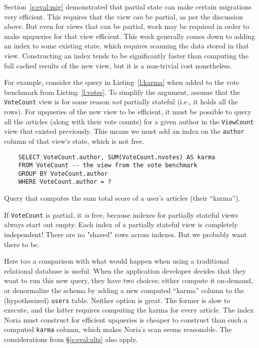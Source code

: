 Section~\ref{s:eval:mig} demonstrated that partial state can make certain
migrations very efficient. This requires that the view \emph{can} be partial, as
per the discussion above. But even for views that can be partial, work may be
required in order to make upqueries for that view efficient. This work generally
comes down to adding an index to some existing state, which requires scanning
the data stored in that view. Constructing an index tends to be significantly
faster than computing the full cached results of the new view, but it is a
non-trivial cost nonetheless.

For example, consider the query in Listing~\ref{l:karma} when added to the vote
benchmark from Listing~\ref{l:votes}. To simplify the argument, assume that the
\texttt{VoteCount} view is for some reason \emph{not} partially stateful (i.e.,
it holds all the rows). For upqueries of the new view to be efficient, it must
be possible to query all the articles (along with their vote counts) for a given
author in the \texttt{ViewCount} view that existed previously. This means we
must add an index on the \texttt{author} column of that view's state, which is
not free.

\begin{listing}[h]
  \begin{verbatim}
    SELECT VoteCount.author, SUM(VoteCount.nvotes) AS karma
    FROM VoteCount -- the view from the vote benchmark
    GROUP BY VoteCount.author
    WHERE VoteCount.author = ?
  \end{verbatim}
  \caption{Query that computes the sum total score of a user's articles
  (their ``karma'').}
  \label{l:scanning-votes}
\end{listing}

\begin{inprogress}
  If \texttt{VoteCount} is partial, it \emph{is} free, because indexes for
  partially stateful views always start out empty. Each index of a partially
  stateful view is completely independent! There are no "shared" rows across
  indexes. But we probably want there to be.
\end{inprogress}

Here too a comparison with what would happen when using a traditional relational
database is useful. When the application developer decides that they want to run
this new query, they have two choices: either compute it on-demand, or
denormalize the schema by adding a new computed ``karma'' column to the
(hypothesized) \texttt{users} table. Neither option is great. The former is slow
to execute, and the latter requires computing the karma for every article.
The index Noria must construct for efficient upqueries is cheaper to construct
than such a computed \texttt{karma} column, which makes Noria's scan seems
reasonable. The considerations from \S\ref{s:eval:alts} also apply.

